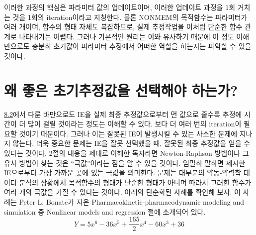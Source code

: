 \documentclass[
  11pt,
  krantz2,
  a4paper]{krantz}
\theoremstyle{definition}
\theoremstyle{definition}
\theoremstyle{definition}
\theoremstyle{remark}
\begin{document}
이러한 과정의 핵심은 파라미터 값의 업데이트이며, 이러한 업데이트 과정을 1회 거치는 것을 1회의 iteration이라고 지칭한다. 물론 NONMEM의 목적함수는 파라미터가 여러 개이며, 함수의 형태 자체도 복잡하므로, 실제 추정작업을 이처럼 단순한 함수 관계로 나타내기는 어렵다. 그러나 기본적인 원리는 이와 유사하기 때문에 이 정도 이해만으로도 충분히 초기값이 파라미터 추정에서 어떠한 역할을 하는지는 파악할 수 있을 것이다.

\hypertarget{uxc65c-uxc88buxc740-uxcd08uxae30uxcd94uxc815uxac12uxc744-uxc120uxd0dduxd574uxc57c-uxd558uxb294uxac00}{%
\section{왜 좋은 초기추정값을 선택해야 하는가?}\label{uxc65c-uxc88buxc740-uxcd08uxae30uxcd94uxc815uxac12uxc744-uxc120uxd0dduxd574uxc57c-uxd558uxb294uxac00}}

\protect\hyperlink{IE-role}{8.2}에서 다룬 바만으로도 IE을 실제 최종 추정값으로부터 먼 값으로 줄수록 추정에 시간이 더 많이 걸릴 것이라는 정도는 이해할 수 있다. 보다 더 여러 번의 iteration이 필요할 것이기 때문이다. 그러나 이는 잘못된 IE이 발생시킬 수 있는 사소한 문제에 지나지 않는다. 더욱 중요한 문제는 IE을 잘못 선택했을 때, 잘못된 최종 추정값을 얻을 수 있다는 것이다. 2절의 내용을 제대로 이해한 독자라면 Newton-Raphson 방법이나 그 유사 방법이 찾는 것은 ``극값''이라는 점을 알 수 있을 것이다. 엄밀히 말하면 제시한 IE으로부터 가장 가까운 곳에 있는 극값을 의미한다. 문제는 대부분의 약동-약력학 데이터 분석의 상황에서 목적함수의 형태가 단순한 형태가 아니며 따라서 그러한 함수가 여러 개의 극값을 가질 수 있다는 것이다. 아래의 단순화된 사례를 확인해 보자. 이 사례는 Peter L. Bonate가 지은 Pharmacokinetic-pharmacodynamic modeling and simulation 중 Nonlinear models and regression 절에 소개되어 있다.
\begin{equation}
Y = 5x^6 - 36x^5 + \frac{165}{2}x^4 - 60x^3 + 36
\label{eq:multiplepoles}
\end{equation}
\end{document}
